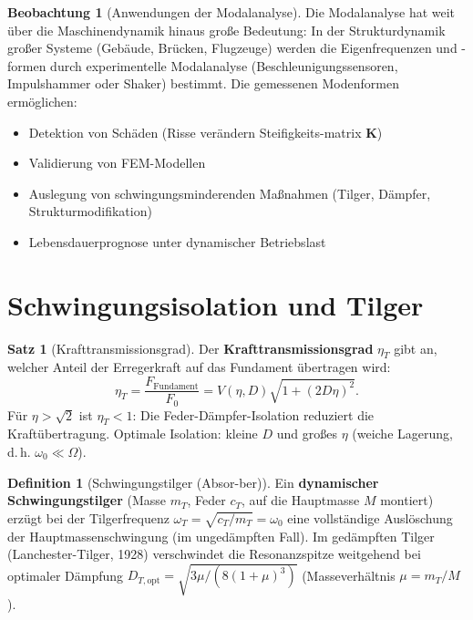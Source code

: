 ﻿\documentclass[a4paper,12pt]{report}
\theoremstyle{definition}
\newtheorem{definition}{Definition}
\newtheorem{satz}{Satz}
\newtheorem{beobachtung}{Beobachtung}
\begin{document}
\begin{beobachtung}[Anwendungen der Modalanalyse]
Die Modalanalyse hat weit \"uber die Maschinendynamik hinaus gro\ss{}e Bedeutung:
In der Strukturdynamik gro\ss{}er Systeme (Geb\"aude, Br\"ucken, Flugzeuge) werden
die Eigenfrequenzen und -formen durch experimentelle Modalanalyse
(Beschleunigungssensoren, Impulshammer oder Shaker) bestimmt.
Die gemessenen Modenformen erm\"oglichen:
\begin{itemize}
    \item[-] Detektion von Sch\"aden (Risse ver\"andern Steifigkeits-matrix $\mathbf{K}$)
    \item[-] Validierung von FEM-Modellen
    \item[-] Auslegung von schwingungsminderenden Ma\ss{}nahmen
          (Tilger, D\"ampfer, Strukturmodifikation)
    \item[-] Lebensdauerprognose unter dynamischer Betriebslast
\end{itemize}
\end{beobachtung}

\section{Schwingungsisolation und Tilger}

\begin{satz}[Krafttransmissionsgrad]
Der \textbf{Krafttransmissionsgrad} $\eta_T$ gibt an, welcher Anteil
der Erregerkraft auf das Fundament \"ubertragen wird:
\[
  \eta_T = \frac{F_{\text{Fundament}}}{F_0} = V(\eta,D)\sqrt{1 + (2D\eta)^2}.
\]
F\"ur $\eta > \sqrt{2}$ ist $\eta_T < 1$: Die Feder-D\"ampfer-Isolation
reduziert die Kraft\"ubertragung. Optimale Isolation: kleine $D$ und gro\ss{}es $\eta$
(weiche Lagerung, d.\,h. $\omega_0 \ll \Omega$).
\end{satz}

\begin{definition}[Schwingungstilger (Absor-ber)]
Ein \textbf{dynamischer Schwingungstilger} (Masse $m_T$, Feder $c_T$,
auf die Hauptmasse $M$ montiert) erz\"ugt bei der Tilgerfrequenz
$\omega_T = \sqrt{c_T/m_T} = \omega_0$ eine vollst\"andige Ausl\"oschung
der Hauptmassenschwingung (im unged\"ampften Fall).
Im ged\"ampften Tilger (Lanchester-Tilger, 1928) verschwindet die
Resonanzspitze weitgehend bei optimaler D\"ampfung
$D_{T,\text{opt}} = \sqrt{3\mu/(8(1+\mu)^3)}$ (Masseverh\"altnis $\mu = m_T/M$).
\end{definition}

\end{document}
